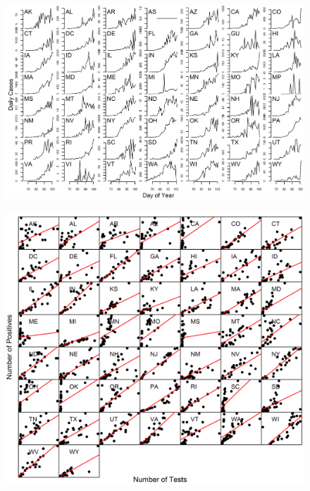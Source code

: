 \documentclass[11pt]{article}
\begin{document}
\begin{figure}
\centering
\hspace*{0cm}\includegraphics[width=16cm]{states_daily_cases.png}
\caption{}
\label{fig:bends}
\end{figure} 

\begin{figure}
\centering
\hspace*{0cm}\includegraphics[width=16cm]{number_of_tests_vs_positives.png}
\caption{}
\label{fig:bends}
\end{figure} 
\end{document}

